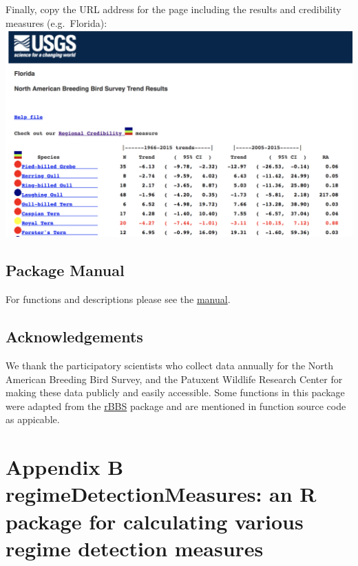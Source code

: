 \documentclass[12pt,twoside,openany]{reedthesis}
\begin{document}
Finally, copy the URL address for the page including the results and credibility measures (e.g.~Florida):
\includegraphics{./chapterFiles/appendices/regcred_fl_ex.png}

\hypertarget{package-manual}{%
\section{Package Manual}\label{package-manual}}

For functions and descriptions please see the \href{github.com/bbsAssistant//bbsAssistant_0.0.0.9000.pdf}{manual}.

\hypertarget{acknowledgements-1}{%
\section{Acknowledgements}\label{acknowledgements-1}}

We thank the participatory scientists who collect data annually for the North American Breeding Bird Survey, and the Patuxent Wildlife Research Center for making these data publicly and easily accessible. Some functions in this package were adapted from the \href{github.com/oharar/rbbs}{rBBS} package and are mentioned in function source code as appicable.

\appendix

\hypertarget{regimeDetectionMeasures}{%
\chapter*{Appendix B regimeDetectionMeasures: an R package for calculating various regime detection measures}\label{regimeDetectionMeasures}}
\end{document}
